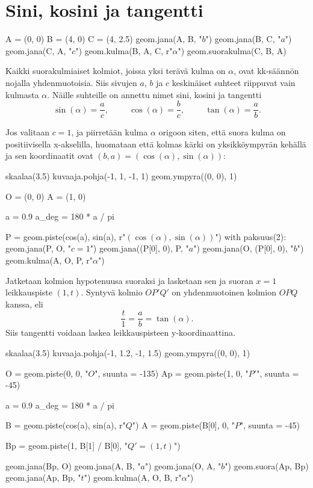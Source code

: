 \section{Sini, kosini ja tangentti}
\begin{kuva}
A = (0, 0)
B = (4, 0)
C = (4, 2.5)
geom.jana(A, B, "$b$")
geom.jana(B, C, "$a$")
geom.jana(C, A, "$c$")
geom.kulma(B, A, C, r"$\alpha$")
geom.suorakulma(C, B, A)
\end{kuva}

Kaikki suorakulmiaiset kolmiot, joissa yksi terävä kulma on $\alpha$, ovat kk-säännön nojalla yhdenmuotoisia. Siis sivujen $a$, $b$ ja $c$ keskinäiset suhteet riippuvat vain kulmasta $\alpha$. Näille suhteille on annettu nimet sini, kosini ja tangentti
\[\sin(\alpha) = \frac{a}{c},\hspace{1cm}\cos(\alpha) = \frac{b}{c}, \hspace{1cm}\tan(\alpha) = \frac{a}{b}.\]

Jos valitaan $c = 1$, ja piirretään kulma $\alpha$ origoon siten, että suora kulma on positiivisella x-akselilla, huomataan että kolmas kärki on yksikköympyrän kehällä ja sen koordinaatit ovat $(b, a) = (\cos(\alpha), \sin(\alpha))$:

\begin{kuva}
skaalaa(3.5)
kuvaaja.pohja(-1, 1, -1, 1)
geom.ympyra((0, 0), 1)

O = (0, 0)
A = (1, 0)

a = 0.9
a_deg = 180 * a / pi

P = geom.piste(cos(a), sin(a), r"$(\cos(\alpha), \sin(\alpha))$")
with paksuus(2):
	geom.jana(P, O, "$c = 1$")
	geom.jana((P[0], 0), P, "$a$")
	geom.jana(O, (P[0], 0), "$b$")
geom.kulma(A, O, P, r"$\alpha$")
\end{kuva}

Jatketaan kolmion hypotenuusa suoraksi ja lasketaan sen ja suoran $x = 1$ leikkauspiste $(1, t)$. Syntyvä kolmio $OP'Q'$ on yhdenmuotoinen kolmion $OPQ$ kanssa, eli
\[\frac{t}{1} = \frac{a}{b} = \tan(\alpha).\]
Siis tangentti voidaan laskea leikkauspisteen y-koordinaattina.

\begin{kuva}
skaalaa(3.5)
kuvaaja.pohja(-1, 1.2, -1, 1.5)
geom.ympyra((0, 0), 1)

O = geom.piste(0, 0, "$O$", suunta = -135)
Ap = geom.piste(1, 0, "$P'$", suunta = -45)

a = 0.9
a_deg = 180 * a / pi

B = geom.piste(cos(a), sin(a), r"$Q$")
A = geom.piste(B[0], 0, "$P$", suunta = -45)

Bp = geom.piste(1, B[1] / B[0], "$Q' = (1, t)$")

geom.jana(Bp, O)
geom.jana(A, B, "$a$")
geom.jana(O, A, "$b$")
geom.suora(Ap, Bp)
geom.jana(Ap, Bp, "$t$")
geom.kulma(A, O, B, r"$\alpha$")
\end{kuva}

